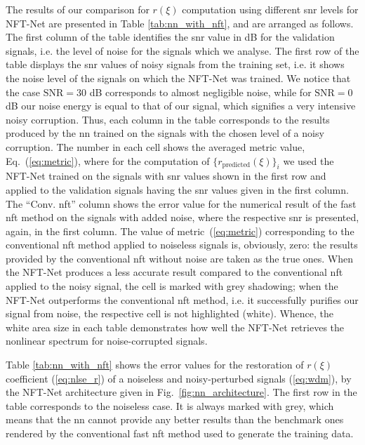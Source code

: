 The results of our comparison for $r(\xi)$ computation using different \acrshort{snr} levels for NFT-Net are presented in Table \ref{tab:nn_with_nft}, and are arranged as follows. The first column of the table identifies the \acrshort{snr} value in dB for the validation signals, i.e. the level of noise for the signals which we analyse. The first row of the table displays the \acrshort{snr} values of noisy signals from the training set, i.e. it shows the noise level of the signals on which the NFT-Net was trained. We notice that the case $\text{SNR}=30$ dB corresponds to almost negligible noise, while for $\text{SNR}=0$ dB our noise energy is equal to that of our signal, which signifies a very intensive noisy corruption. Thus, each column in the table corresponds to the results produced by the \acrshort{nn} trained on the signals with the chosen level of a noisy corruption.
The number in each cell shows the averaged metric value, Eq.~(\ref{eq:metric}), where for the computation of $\{r_{\text{predicted}}(\xi)\}_{i}$ we used the NFT-Net trained on the signals with \acrshort{snr} values shown in the first row and applied to the validation signals having the \acrshort{snr} values given in the first column. The ``Conv. \acrshort{nft}'' column shows the error value for the numerical result of the fast \acrshort{nft} method on the signals with added noise, where the respective \acrshort{snr} is presented, again, in the first column. The value of metric~(\ref{eq:metric}) corresponding to the conventional \acrshort{nft} method applied to noiseless signals is, obviously, zero: the results provided by the conventional \acrshort{nft} without noise are taken as the true ones. 
When the NFT-Net produces a less accurate result compared to the conventional \acrshort{nft} applied to the noisy signal, the cell is marked with grey shadowing; when the NFT-Net outperforms the conventional \acrshort{nft} method, i.e. it successfully purifies our signal from noise, the respective cell is not highlighted (white). 
Whence, the white area size in each table demonstrates how well the NFT-Net retrieves the nonlinear spectrum for noise-corrupted signals.




Table \ref{tab:nn_with_nft} shows the error values for the restoration of $r(\xi)$ coefficient (\ref{eq:nlse_r}) of a noiseless and noisy-perturbed signals (\ref{eq:wdm}), by the NFT-Net architecture given in Fig.~\ref{fig:nn_architecture}. The first row in the table corresponds to the noiseless case. It is always marked with grey, which means that the \acrshort{nn} cannot provide any better results than the benchmark ones rendered by the conventional fast \acrshort{nft} method used to generate the training data. 

